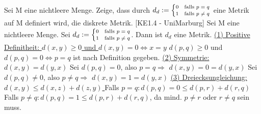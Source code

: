 \documentclass[a6paper
	,10pt
	,grid=none
]{kartei}
\begin{document}
\begin{karte}
	[Metrik]
	{
		Sei M eine nichtleere Menge. Zeige, dass durch $d_d := \scriptsize \begin{cases} 0 & \text{falls }p=q \\ 1 & \text{falls }p \neq q \normalsize \end{cases}$ eine Metrik auf M definiert wird, die diskrete Metrik.
	}
	[KE1.4 - UniMarburg]
	{
		Sei M eine nichtleere Menge. Sei $d_d := \scriptsize \begin{cases} 0 & \text{falls }p=q \\ 1 & \text{falls }p \neq q \normalsize \end{cases}$. Dann ist $d_d$ eine Metrik.
		\newline\newline\newline
		\underline{(1) Positive Definitheit: 	$d(x,y) \geq 0$ und $d(x,y)=0 \Leftrightarrow x=y$}
		\newline
		$d(p,q) \geq 0$ und $d(p,q)=0 \Leftrightarrow p=q$ ist nach Definition gegeben.
		\newline\newline
		\underline{(2) Symmetrie: 	$d(x,y)=d(y,x)$}
		\newline
		Sei $d(p,q)=0$, also $p=q \Rightarrow$ $d(x,y)=0=d(y,x)$
		\newline
		Sei $d(p,q) \neq 0$, also $p \neq q \Rightarrow$ $d(x,y)=1=d(y,x)$
		\newline\newline
		\underline{(3) Dreiecksungleichung: $d(x,y) \leq d(x,z)+d(z,y)$ }
		\newline
		Falls $p=q: d(p,q) = 0 \leq d(p,r) + d(r,q)$ \newline
		Falls $p \neq q: d(p,q) = 1 \leq d(p,r) + d(r,q)$, da mind. $p \neq r$ oder $r \neq q$ sein muss.
	}
\end{karte}
\end{document}
